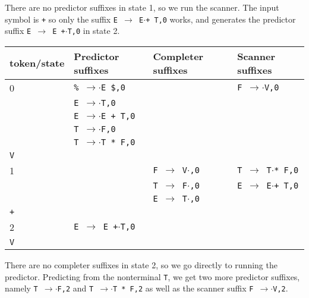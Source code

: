 \documentclass[11pt]{article}
\def\ra{\rightarrow}
\begin{document}
There are no predictor suffixes in state 1, so we run the scanner.  The
input symbol is \texttt{+} so only the suffix \texttt{E $\ra$
  E$\cdot$+ T,0} works, and generates the predictor suffix \texttt{E $\ra$ E
  +$\cdot$T,0} in state 2. 

\begin{tabular}{|l|l|l|l|}
\hline
token/state & Predictor suffixes & Completer suffixes & Scanner suffixes\\
\hline
0     & \texttt{\% $\ra$$\cdot$E \$,0} & & \texttt{F $\ra$$\cdot$V,0}\\
      & \texttt{E $\ra$$\cdot$T,0} & & \\
      & \texttt{E $\ra$$\cdot$E + T,0} & & \\
      & \texttt{T $\ra$$\cdot$F,0} & & \\
      & \texttt{T $\ra$$\cdot$T * F,0} & & \\
\hline
\texttt{V} &  & &\\
\hline
1     &  & \texttt{F $\ra$ V$\cdot$,0}& \texttt{T $\ra$ T$\cdot$* F,0} \\
      &  & \texttt{T $\ra$ F$\cdot$,0}& \texttt{E $\ra$ E$\cdot$+ T,0} \\
      &  & \texttt{E $\ra$ T$\cdot$,0}& \\
\hline
\texttt{+} &  & &\\
\hline
 2    & \texttt{E $\ra$ E +$\cdot$T,0} & & \\
\hline 
\texttt{V} &  & &\\
\hline
\end{tabular}

There are no completer suffixes in state 2, so we go directly to
running the predictor.  Predicting from the nonterminal \texttt{T}, we
get two more predictor suffixes, namely \texttt{T $\ra$$\cdot$F,2} and
\texttt{T $\ra$$\cdot$T * F,2} as well as the scanner suffix \texttt{F
  $\ra$$\cdot$V,2}. 
\end{document}
